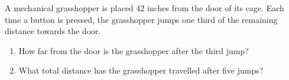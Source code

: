 A mechanical grasshopper is placed $42$ inches from the door of its cage. Each time a button is pressed, the grasshopper jumps one third of the remaining distance towards the door.
\begin{enumerate}
\item[(a)] How far from the door is the grasshopper after the third jump?
\item[(b)] What total distance has the grasshopper travelled after five jumps?
\end{enumerate}
